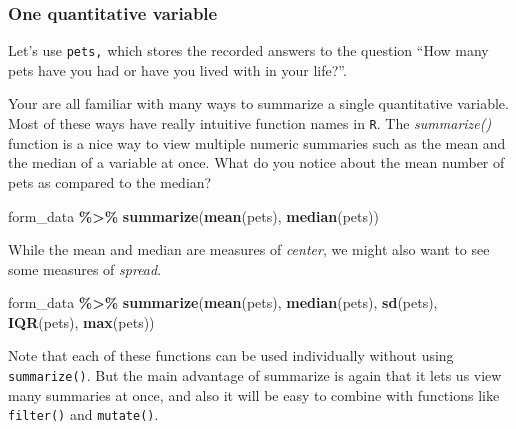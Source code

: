\documentclass[
]{article}
\newenvironment{Shaded}{\begin{snugshade}}{\end{snugshade}}
\newcommand{\FunctionTok}[1]{\textcolor[rgb]{0.13,0.29,0.53}{\textbf{#1}}}
\newcommand{\NormalTok}[1]{#1}
\newcommand{\SpecialCharTok}[1]{\textcolor[rgb]{0.81,0.36,0.00}{\textbf{#1}}}
\begin{document}
\subsubsection{One quantitative
variable}\label{one-quantitative-variable}

Let's use \texttt{pets,} which stores the recorded answers to the
question ``How many pets have you had or have you lived with in your
life?''.

Your are all familiar with many ways to summarize a single quantitative
variable. Most of these ways have really intuitive function names in
\texttt{R}. The \emph{summarize()} function is a nice way to view
multiple numeric summaries such as the mean and the median of a variable
at once. What do you notice about the mean number of pets as compared to
the median?

\begin{Shaded}
\begin{Highlighting}[]
\NormalTok{form\_data }\SpecialCharTok{\%\textgreater{}\%} \FunctionTok{summarize}\NormalTok{(}\FunctionTok{mean}\NormalTok{(pets), }\FunctionTok{median}\NormalTok{(pets))}
\end{Highlighting}
\end{Shaded}

While the mean and median are measures of \emph{center}, we might also
want to see some measures of \emph{spread}.

\begin{Shaded}
\begin{Highlighting}[]
\NormalTok{form\_data }\SpecialCharTok{\%\textgreater{}\%} \FunctionTok{summarize}\NormalTok{(}\FunctionTok{mean}\NormalTok{(pets), }\FunctionTok{median}\NormalTok{(pets), }\FunctionTok{sd}\NormalTok{(pets), }\FunctionTok{IQR}\NormalTok{(pets), }\FunctionTok{max}\NormalTok{(pets))}
\end{Highlighting}
\end{Shaded}

Note that each of these functions can be used individually without using
\texttt{summarize()}. But the main advantage of summarize is again that
it lets us view many summaries at once, and also it will be easy to
combine with functions like \texttt{filter()} and \texttt{mutate()}.

\begin{Shaded}
\end{Shaded}
\end{document}
